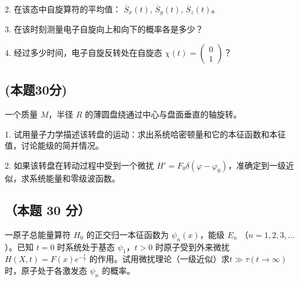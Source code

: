 2. 在该态中自旋算符的平均值： $\overline S_x(t)$, $\overline S_y(t) $, $\overline S_z(t)$。

3. 在该时刻测量电子自旋向上和向下的概率各是多少？

4. 经过多少时间，电子自旋反转处在自旋态 $\chi(t) = \begin{pmatrix} 0 \\ 1 \end{pmatrix}$？

\subsection{(本题30分)}
一个质量 $M$，半径 $R$ 的薄圆盘绕通过中心与盘面垂直的轴旋转。

1. 试用量子力学描述该转盘的运动：求出系统哈密顿量和它的本征函数和本征值，讨论能级的简并情况。

2. 如果该转盘在转动过程中受到一个微扰 $H' = F_0 \delta(\varphi - \varphi_0)$，准确定到一级近似，求系统能量和零级波函数。

\subsection{（本题 30 分）}
一原子总能量算符 $H_0$ 的正交归一本征函数为 $\psi_n(x)$，能级 $E_n$ （$n = 1, 2, 3, \ldots$）。已知 $t = 0$ 时系统处于基态 $\psi_1$，$t > 0$ 时原子受到外来微扰 $H(X,t) = F(x) e^{-\frac{t}{\tau}}$ 的作用。试用微扰理论（一级近似）求$t\gg\tau(t \rightarrow \infty)$ 时，原子处于各激发态 $ \psi_n $ 的概率。